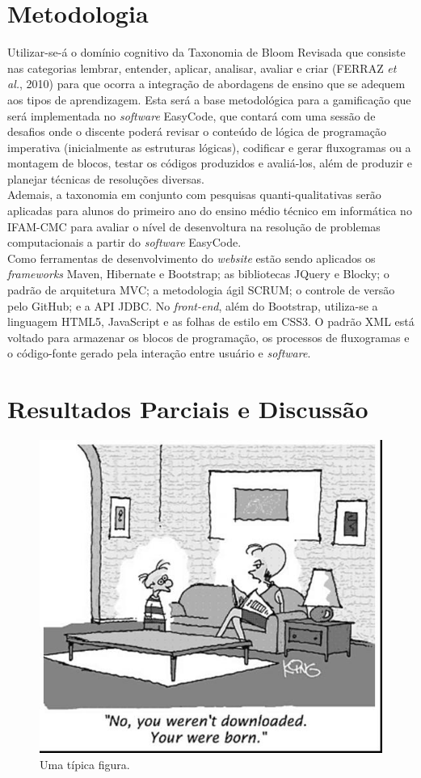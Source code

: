 \documentclass[12pt]{article}
\begin{document}
\section{Metodologia} 
Utilizar-se-á o domínio cognitivo da Taxonomia de Bloom Revisada que consiste nas categorias lembrar, entender, aplicar, analisar, avaliar e criar (FERRAZ \textit{et al.}, 2010) para que ocorra a integração de abordagens de ensino que se adequem aos tipos de aprendizagem. Esta será a base metodológica para a gamificação que será implementada no \textit{software} EasyCode, que contará com uma sessão de desafios onde o discente poderá revisar o conteúdo de lógica de programação imperativa (inicialmente as estruturas lógicas), codificar e gerar fluxogramas ou a montagem de blocos, testar os códigos produzidos e avaliá-los, além de produzir e planejar técnicas de resoluções diversas.
\\Ademais, a taxonomia em conjunto com pesquisas quanti-qualitativas serão aplicadas para alunos do primeiro ano do ensino médio técnico em informática no IFAM-CMC para avaliar o nível de desenvoltura na resolução de problemas computacionais a partir do \textit{software} EasyCode.
\\Como ferramentas de desenvolvimento do \textit{website} estão sendo aplicados os \textit{frameworks} Maven, Hibernate e Bootstrap; as bibliotecas JQuery e Blocky; o padrão de arquitetura MVC; a metodologia ágil SCRUM; o controle de versão pelo GitHub; e a API JDBC. No \textit{front-end}, além do Bootstrap, utiliza-se a linguagem HTML5, JavaScript e as folhas de estilo em CSS3. O padrão XML está voltado para armazenar os blocos de programação, os processos de fluxogramas e o código-fonte gerado pela interação entre usuário e \textit{software}. 


\section{Resultados Parciais e Discussão}
	\begin{figure}[h]
		\centering
		\includegraphics[scale=0.2]{fig1.jpg}
		\caption{Uma típica figura.}
		\label{fig1}
	\end{figure}
\end{document}
